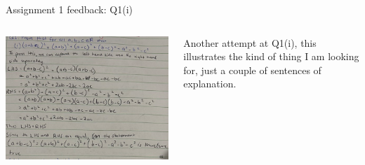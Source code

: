 \documentclass[aspectratio=169]{beamer}
\begin{document}
\begin{frame}{Assignment 1 feedback: Q1(i)}
\begin{columns}
\begin{column}{0.6\textwidth}
    \begin{center}
  \includegraphics[width=\textwidth]{Q1a}
     \end{center}
\end{column}
\begin{column}{0.4\textwidth}
  Another attempt at Q1(i), this illustrates the kind of thing I am looking for, just a couple of sentences of explanation.
\end{column}
\end{columns}
\end{frame}
\end{document}
